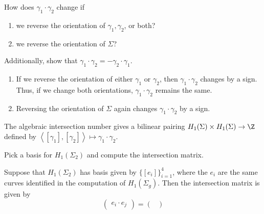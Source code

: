 \begin{problem}
	How does $\gamma_1 \cdot \gamma_2$ change if
	\begin{enumerate}
		\item we reverse the orientation of $\gamma_1,\gamma_2$, or both?
		\item we reverse the orientation of $\Sigma$?
	\end{enumerate}
	Additionally, show that $\gamma_1 \cdot \gamma_2 = -\gamma_2 \cdot \gamma_1$.
\end{problem}
\begin{solution}
	\begin{enumerate}
		\item If we reverse the orientation of either $\gamma_1$ or $\gamma_2$, then $\gamma_1 \cdot \gamma_2$ changes by a sign. Thus, if we change both orientations, $\gamma_1 \cdot \gamma_2$ remains the same.
		\item Reversing the orientation of $\Sigma$ again changes $\gamma_1 \cdot \gamma_2$ by a sign.
	\end{enumerate}
\end{solution}


\begin{proposition}
	The algebraic intersection number gives a bilinear pairing $H_1(\Sigma) \times H_1(\Sigma) \to \Z$ defined by $\left< [\gamma_1], [\gamma_2] \right> \mapsto \gamma_1 \cdot \gamma_2$.
\end{proposition}

\begin{problem}
	Pick a basis for $H_1(\Sigma_2)$ and compute the intersection matrix.
\end{problem}
\begin{solution}
	Suppose that $H_1(\Sigma_2)$ has basis given by $\{[e_i]\}_{i = 1}^4$, where the $e_i$ are the same curves identified in the computation of $H_1(\Sigma_g)$. Then the intersection matrix is given by \[ \begin{pmatrix} e_i \cdot e_j \end{pmatrix} = \begin{pmatrix}  \end{pmatrix}  \] 
\end{solution}

